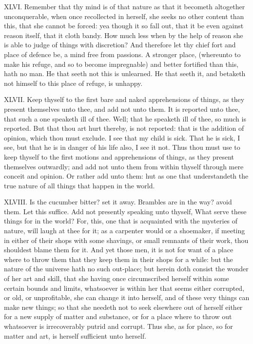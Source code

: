 XLVI. Remember that thy mind is of that nature as that it becometh
altogether unconquerable, when once recollected in herself, she seeks no
other content than this, that she cannot be forced: yea though it so fall
out, that it be even against reason itself, that it cloth bandy. How much
less when by the help of reason she is able to judge of things with
discretion? And therefore let thy chief fort and place of defence be, a
mind free from passions. A stronger place, (whereunto to make his refuge,
and so to become impregnable) and better fortified than this, hath no man.
He that seeth not this is unlearned. He that seeth it, and betaketh not
himself to this place of refuge, is unhappy.

XLVII. Keep thyself to the first bare and naked apprehensions of things,
as they present themselves unto thee, and add not unto them. It is
reported unto thee, that such a one speaketh ill of thee. Well; that he
speaketh ill of thee, so much is reported. But that thou art hurt thereby,
is not reported: that is the addition of opinion, which thou must exclude.
I see that my child is sick. That he is sick, I see, but that he is in
danger of his life also, I see it not. Thus thou must use to keep thyself
to the first motions and apprehensions of things, as they present
themselves outwardly; and add not unto them from within thyself through
mere conceit and opinion. Or rather add unto them: hut as one that
understandeth the true nature of all things that happen in the world.

XLVIII. Is the cucumber bitter? set it away. Brambles are in the way?
avoid them. Let this suffice. Add not presently speaking unto thyself,
What serve these things for in the world? For, this, one that is
acquainted with the mysteries of nature, will laugh at thee for it; as a
carpenter would or a shoemaker, if meeting in either of their shops with
some shavings, or small remnants of their work, thou shouldest blame them
for it. And yet those men, it is not for want of a place where to throw
them that they keep them in their shops for a while: but the nature of the
universe hath no such out-place; but herein doth consist the wonder of her
art and skill, that she having once circumscribed herself within some
certain bounds and limits, whatsoever is within her that seems either
corrupted, or old, or unprofitable, she can change it into herself, and of
these very things can make new things; so that she needeth not to seek
elsewhere out of herself either for a new supply of matter and substance,
or for a place where to throw out whatsoever is irrecoverably putrid and
corrupt. Thus she, as for place, so for matter and art, is herself
sufficient unto herself.

